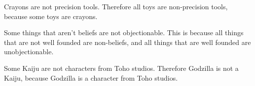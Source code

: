 {\begin{exercises}
{}


\item Crayons are not precision tools. Therefore all toys are non-precision tools, because some toys are crayons.



   
\item  Some things that aren't beliefs are not objectionable. This is because all things that are not well founded are non-beliefs, and all things that are well founded are unobjectionable. 

         
\item Some Kaiju are not characters from Toho studios. Therefore Godzilla is not a Kaiju, because Godzilla is a character from Toho studios.  



\end{exercises}}
